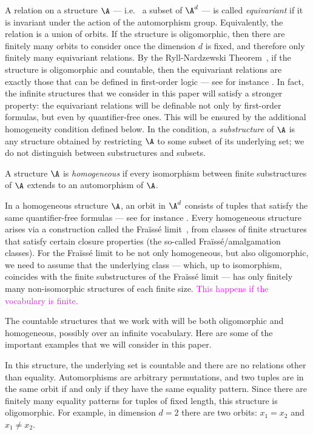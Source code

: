 A relation on a structure $\A$ --- i.e.~ a subset of $\A^d$ --- is called \emph{equivariant} if it is invariant under the action of the automorphism group. 
Equivalently, the relation is a union of orbits. 
If the structure is oligomorphic, then there are finitely many orbits to consider once the dimension $d$ is fixed, 
and therefore  only finitely many equivariant relations. 
By the Ryll-Nardzewski Theorem~\cite[Thm.~7.3.1]{hodges1993model}, if the structure is oligomorphic and countable, 
then the equivariant relations are exactly those that can be defined in first-order logic 
--- see for instance \cite[Lem.~5.9]{bojanczyk_slightly}. 
In fact, the infinite structures that we consider in this paper will satisfy a stronger property: 
the equivariant relations will be definable not only by first-order formulas, but even by quantifier-free ones. 
This will be ensured by the additional homogeneity condition defined below. 
In the condition, a \emph{substructure} of $\A$ is any structure obtained by restricting $\A$ to some subset  of its underlying set; 
we do not distinguish between substructures and subsets.

\begin{definition}
     A structure $\A$ is \emph{homogeneous} if every isomorphism between finite substructures of $\A$ extends to an automorphism of $\A$.
\end{definition}

In a homogeneous structure $\A$, an orbit in $\A^d$ consists of tuples that satisfy the same quantifier-free formulas --- see for instance \cite[Thm.~6.3]{bojanczyk_slightly}. 
Every homogeneous structure arises via a construction called the Fraïssé limit~\cite[Sec.~7.4]{hodges1993model}, from classes of finite structures that satisfy certain closure properties (the so-called Fraïssé/amalgamation classes). 
For the Fraïssé limit to be not only homogeneous, but also oligomorphic, we need to assume that the underlying class --- which, up to isomorphism, coincides with the finite substructures of the Fraïssé limit --- has only finitely many non-isomorphic structures of each finite size. 
\textcolor{magenta}{This happens if the vocabulary is finite.}

The countable structures that we work with will be both oligomorphic and homogeneous, possibly over an infinite vocabulary. 
Here are some of the important examples that we will consider in this paper.

\begin{myexample} \label{ex:equality-atoms} In this structure, the underlying set is countable and there are no relations other than equality.  Automorphisms are arbitrary permutations, and two tuples are in the same orbit if and only if they have the same equality pattern. Since there are finitely many equality patterns for tuples of fixed length, this structure is oligomorphic. For example, in dimension $d=2$ there are two orbits: $x_1=x_2$ and $x_1 \neq x_2$.
\end{myexample}

